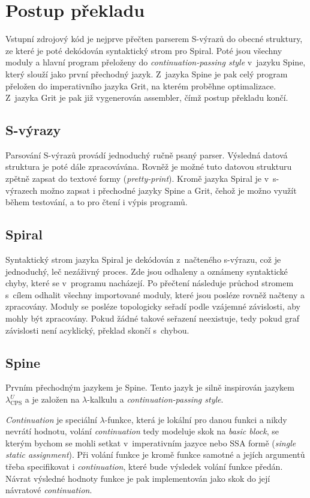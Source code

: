 \chapter{Postup překladu}

Vstupní zdrojový kód je nejprve přečten parserem S-výrazů do obecné struktury,
ze které je poté dekódován syntaktický strom pro Spiral. Poté jsou všechny
moduly a hlavní program přeloženy do \emph{continuation-passing style} v~jazyku
Spine, který slouží jako první přechodný jazyk. Z~jazyka Spine je pak celý
program přeložen do imperativního jazyka Grit, na kterém proběhne optimalizace.
Z~jazyka Grit je pak již vygenerován assembler, čímž postup překladu končí. 

\section{S-výrazy}

Parsování S-výrazů provádí jednoduchý ručně psaný parser. Výsledná datová
struktura je poté dále zpracovávána. Rovněž je možné tuto datovou strukturu
zpětně zapsat do textové formy (\emph{pretty-print}). Kromě jazyka Spiral je
v~s-výrazech možno zapsat i přechodné jazyky Spine a Grit, čehož je možno využít
během testování, a to pro čtení i výpis programů.

\section{Spiral}

Syntaktický strom jazyka Spiral je dekódován z~načteného s-výrazu, což je
jednoduchý, leč nezáživný proces. Zde jsou odhaleny a oznámeny syntaktické
chyby, které se v~programu nacházejí. Po přečtení následuje průchod stromem
s~cílem odhalit všechny importované moduly, které jsou posléze rovněž načteny a
zpracovány. Moduly se posléze topologicky seřadí podle vzájemné závislosti, aby
mohly být zpracovány. Pokud žádné takové seřazení neexistuje, tedy pokud graf
závislosti není acyklický, překlad skončí s~chybou.

\section{Spine}

Prvním přechodným jazykem je Spine. Tento jazyk je silně inspirován jazykem
$\lambda^U_\text{CPS}$ \cite{kennedy2007compiling} a je založen na
$\lambda$-kalkulu a \emph{continuation-passing style}.

\emph{Continuation} je speciální $\lambda$-funkce, která je lokální pro danou
funkci a nikdy nevrátí hodnotu, volání \emph{continuation} tedy modeluje skok na
\emph{basic block}, se kterým bychom se mohli setkat v~imperativním jazyce nebo
SSA formě (\emph{single static assignment}). Při volání funkce je kromě funkce
samotné a jejích argumentů třeba specifikovat i \emph{continuation}, které bude
výsledek volání funkce předán. Návrat výsledné hodnoty funkce je pak
implementován jako skok do její návratové \emph{continuation}.

